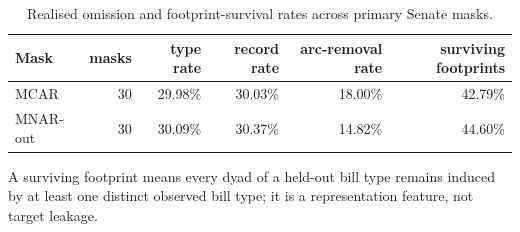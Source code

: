 \begin{table}[tbp]
\centering
\small
\caption{Realised omission and footprint-survival rates across primary Senate masks.}
\label{tab:mask-realisation}
\begin{tabular}{lrrrrr}
\toprule
Mask & masks & type rate & record rate & arc-removal rate & surviving footprints \\
\midrule
MCAR & 30 & 29.98\% & 30.03\% & 18.00\% & 42.79\% \\
MNAR-out & 30 & 30.09\% & 30.37\% & 14.82\% & 44.60\% \\
\bottomrule
\end{tabular}
\par\vspace{2pt}\footnotesize A surviving footprint means every dyad of a held-out bill type remains induced by at least one distinct observed bill type; it is a representation feature, not target leakage.
\end{table}
